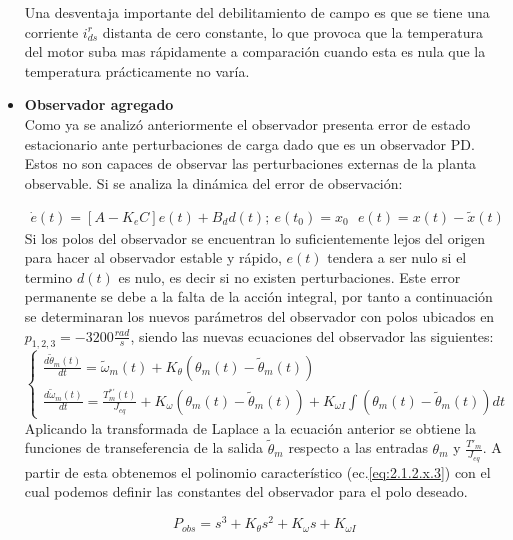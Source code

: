 \documentclass[10pt]{article}
\begin{document}
\begin{itemize}
	Una desventaja importante del debilitamiento de campo es que se tiene una corriente $i^{r}_{ds}$ distanta de cero constante, lo que provoca que la temperatura del motor suba mas rápidamente a comparación cuando esta es nula que la temperatura prácticamente no varía.
	\newpage
	\item \textbf{Observador agregado}\\
	Como ya se analizó anteriormente el observador presenta error de estado estacionario ante perturbaciones de carga dado que es un observador PD. 
	Estos no son capaces de observar las perturbaciones externas de la planta observable. Si se analiza la dinámica del error de observación:

	\begin{eqnarray}
		\dot{e}(t)=[A-K_{e}C]e(t)+B_{d}d(t); \ e(t_{0})=x_{0}  \ \ \
		e(t)=x(t)-\tilde{x}(t)
		\label{eq:2.1.2.x.1}
	\end{eqnarray}
	Si los polos del observador se encuentran lo suficientemente lejos del origen para hacer al observador estable y rápido, $e(t)$ tendera a ser nulo si el termino $d(t)$ es nulo, es decir si no existen perturbaciones. Este error permanente se debe a la falta de la acción integral, por tanto a continuación se determinaran
	los nuevos parámetros del observador con polos ubicados en $p_{1,2,3}=-3200 \frac{rad}{s}$, siendo las nuevas ecuaciones del observador las siguientes:
	\begin{equation}
		\left\{\begin{matrix}
			\frac{d\tilde{\theta}_{m}(t)}{dt}=\tilde{\omega}_{m}(t)+K_{\theta}(\theta_{m}(t)-\tilde{\theta}_{m}(t))\\
			\frac{d\tilde{\omega}_{m}(t)}{dt}=\frac{T^{*'}_{m}(t)}{J_{eq}}+K_{\omega}(\theta_{m}(t)-\tilde{\theta}_{m}(t))+K_{\omega I}\int (\theta_{m}(t)-\tilde{\theta}_{m}(t))dt
			
			\end{matrix}\right.
			\label{eq:2.1.2.x.2}
	\end{equation}
	Aplicando la transformada de Laplace a la ecuación anterior se obtiene la funciones de transeferencia de la salida $\tilde{\theta}_{m}$ respecto a las entradas $\theta_{m}$ y $\frac{T'_{m}}{J_{eq}}$. A partir de esta obtenemos el polinomio característico (ec.\ref{eq:2.1.2.x.3}) con el cual podemos definir las constantes del observador para el polo deseado.

		\begin{equation}
		P_{obs}=s^{3}+K_{\theta}s^{2}+K_{\omega}s+K_{\omega I}
			\label{eq:2.1.2.x.3}
	\end{equation}


\end{itemize}
\end{document}
